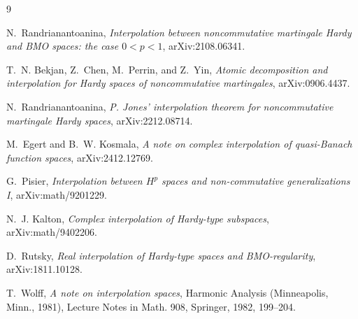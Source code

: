 \documentclass[11pt]{article}
\begin{document}
\begin{thebibliography}{9}

N.~Randrianantoanina,
\emph{Interpolation between noncommutative martingale Hardy and BMO spaces:
the case \(0<p<1\)},
arXiv:2108.06341.

T.~N. Bekjan, Z.~Chen, M.~Perrin, and Z.~Yin,
\emph{Atomic decomposition and interpolation for Hardy spaces of
noncommutative martingales},
arXiv:0906.4437.

N.~Randrianantoanina,
\emph{P. Jones' interpolation theorem for noncommutative martingale Hardy
spaces},
arXiv:2212.08714.

M.~Egert and B.~W. Kosmala,
\emph{A note on complex interpolation of quasi-Banach function spaces},
arXiv:2412.12769.

G.~Pisier,
\emph{Interpolation between \(H^p\) spaces and non-commutative
generalizations I},
arXiv:math/9201229.

N.~J. Kalton,
\emph{Complex interpolation of Hardy-type subspaces},
arXiv:math/9402206.

D.~Rutsky,
\emph{Real interpolation of Hardy-type spaces and BMO-regularity},
arXiv:1811.10128.

T.~Wolff,
\emph{A note on interpolation spaces},
Harmonic Analysis (Minneapolis, Minn., 1981), Lecture Notes in Math. 908,
Springer, 1982, 199--204.

\end{thebibliography}
\end{document}
